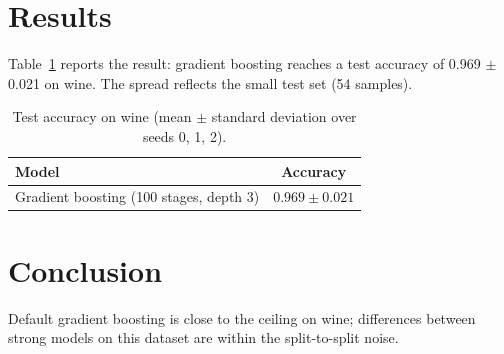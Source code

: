 \documentclass[11pt]{article}
\begin{document}
\section{Results}
Table~\ref{tab:wine} reports the result: gradient boosting reaches a test accuracy of
0.969 $\pm$ 0.021 on wine. The spread reflects the small test set (54 samples).

\begin{table}[t]
\centering
\caption{Test accuracy on wine (mean $\pm$ standard deviation over seeds 0, 1, 2).}
\label{tab:wine}
\begin{tabular}{lc}
\toprule
Model & Accuracy \\
\midrule
Gradient boosting (100 stages, depth 3) & $0.969 \pm 0.021$ \\
\bottomrule
\end{tabular}
\end{table}

\section{Conclusion}
Default gradient boosting is close to the ceiling on wine; differences between strong models on
this dataset are within the split-to-split noise.
\end{document}
